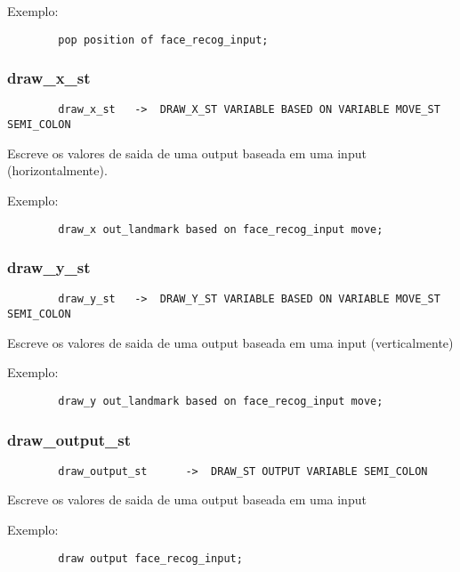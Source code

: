 \documentclass[a4paper,10pt]{article}
\begin{document}
		Exemplo:
		\begin{lstlisting}
		pop position of face_recog_input;
		\end{lstlisting}
		\vspace{10mm}
	\subsubsection{draw\_x\_st}
		\begin{lstlisting}
		draw_x_st	->	DRAW_X_ST VARIABLE BASED ON VARIABLE MOVE_ST SEMI_COLON
		\end{lstlisting}
		Escreve os valores de saida de uma output baseada em uma input (horizontalmente).
		
		Exemplo:
		\begin{lstlisting}
		draw_x out_landmark based on face_recog_input move;
		\end{lstlisting}
		\vspace{10mm}
	\subsubsection{draw\_y\_st}
		\begin{lstlisting}
		draw_y_st	->	DRAW_Y_ST VARIABLE BASED ON VARIABLE MOVE_ST SEMI_COLON
		\end{lstlisting}
		Escreve os valores de saida de uma output baseada em uma input (verticalmente)
		
		Exemplo:
		\begin{lstlisting}
		draw_y out_landmark based on face_recog_input move;
		\end{lstlisting}
		\vspace{10mm}
	\subsubsection{draw\_output\_st}
		\begin{lstlisting}
		draw_output_st		->	DRAW_ST OUTPUT VARIABLE SEMI_COLON
		\end{lstlisting}
		Escreve os valores de saida de uma output baseada em uma input
		
		Exemplo:
		\begin{lstlisting}
		draw output face_recog_input;
		\end{lstlisting}
		\vspace{10mm}
\end{document}
